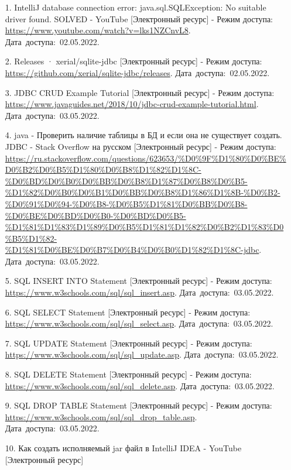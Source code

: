 \documentclass[12pt, a4paper, simple]{eskdtext}
\begin{document}
    \begin{enumerate}
        \item[1.] IntelliJ database connection error: java.sql.SQLException: No suitable driver found. SOLVED - YouTube [Электронный ресурс]
        - Режим доступа: \url{https://www.youtube.com/watch?v=lks1NZCnvL8}.
        Дата~доступа:~02.05.2022.
        \item[2.] Releases · xerial/sqlite-jdbc [Электронный ресурс]
        - Режим доступа: \url{https://github.com/xerial/sqlite-jdbc/releases}.
        Дата~доступа:~02.05.2022.
        \item[3.] JDBC CRUD Example Tutorial [Электронный ресурс]
        - Режим доступа: \url{https://www.javaguides.net/2018/10/jdbc-crud-example-tutorial.html}.
        Дата~доступа:~03.05.2022.
        \item[4.] java - Проверить наличие таблицы в БД и если она не существует создать. JDBC - Stack Overflow на русском [Электронный ресурс]
        - Режим доступа: \url{https://ru.stackoverflow.com/questions/623653/%D0%9F%D1%80%D0%BE%D0%B2%D0%B5%D1%80%D0%B8%D1%82%D1%8C-%D0%BD%D0%B0%D0%BB%D0%B8%D1%87%D0%B8%D0%B5-%D1%82%D0%B0%D0%B1%D0%BB%D0%B8%D1%86%D1%8B-%D0%B2-%D0%91%D0%94-%D0%B8-%D0%B5%D1%81%D0%BB%D0%B8-%D0%BE%D0%BD%D0%B0-%D0%BD%D0%B5-%D1%81%D1%83%D1%89%D0%B5%D1%81%D1%82%D0%B2%D1%83%D0%B5%D1%82-%D1%81%D0%BE%D0%B7%D0%B4%D0%B0%D1%82%D1%8C-jdbc}.
        Дата~доступа:~03.05.2022.
        \item[5.] SQL INSERT INTO Statement [Электронный ресурс]
        - Режим доступа: \url{https://www.w3schools.com/sql/sql_insert.asp}.
        Дата~доступа:~03.05.2022.
        \item[6.] SQL SELECT Statement [Электронный ресурс]
        - Режим доступа: \url{https://www.w3schools.com/sql/sql_select.asp}.
        Дата~доступа:~03.05.2022.
        \item[7.] SQL UPDATE Statement [Электронный ресурс]
        - Режим доступа: \url{https://www.w3schools.com/sql/sql_update.asp}.
        Дата~доступа:~03.05.2022.
        \item[8.] SQL DELETE Statement [Электронный ресурс]
        - Режим доступа: \url{https://www.w3schools.com/sql/sql_delete.asp}.
        Дата~доступа:~03.05.2022.
        \item[9.] SQL DROP TABLE Statement [Электронный ресурс]
        - Режим доступа: \url{https://www.w3schools.com/sql/sql_drop_table.asp}.
        Дата~доступа:~03.05.2022.
        \item[10.] Как создать исполняемый jar файл в IntelliJ IDEA - YouTube [Электронный ресурс]

\end{enumerate}
\end{document}
